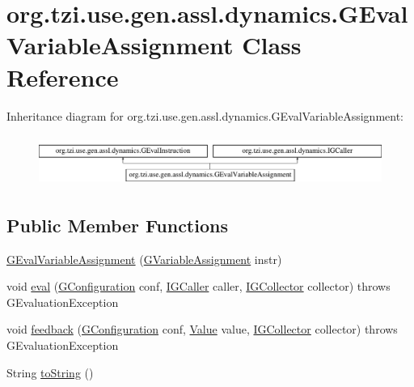 \hypertarget{classorg_1_1tzi_1_1use_1_1gen_1_1assl_1_1dynamics_1_1_g_eval_variable_assignment}{\section{org.\-tzi.\-use.\-gen.\-assl.\-dynamics.\-G\-Eval\-Variable\-Assignment Class Reference}
\label{classorg_1_1tzi_1_1use_1_1gen_1_1assl_1_1dynamics_1_1_g_eval_variable_assignment}
}
Inheritance diagram for org.\-tzi.\-use.\-gen.\-assl.\-dynamics.\-G\-Eval\-Variable\-Assignment\-:\begin{figure}[H]
\begin{center}
\leavevmode
\includegraphics[height=1.661721cm]{classorg_1_1tzi_1_1use_1_1gen_1_1assl_1_1dynamics_1_1_g_eval_variable_assignment}
\end{center}
\end{figure}
\subsection*{Public Member Functions}
\begin{DoxyCompactItemize}
\item 
\hyperlink{classorg_1_1tzi_1_1use_1_1gen_1_1assl_1_1dynamics_1_1_g_eval_variable_assignment_a52f7f8a359e4a9229517839110c53b2a}{G\-Eval\-Variable\-Assignment} (\hyperlink{classorg_1_1tzi_1_1use_1_1gen_1_1assl_1_1statics_1_1_g_variable_assignment}{G\-Variable\-Assignment} instr)
\item 
void \hyperlink{classorg_1_1tzi_1_1use_1_1gen_1_1assl_1_1dynamics_1_1_g_eval_variable_assignment_a989ef77954f72db44505a35152055874}{eval} (\hyperlink{classorg_1_1tzi_1_1use_1_1gen_1_1assl_1_1dynamics_1_1_g_configuration}{G\-Configuration} conf, \hyperlink{interfaceorg_1_1tzi_1_1use_1_1gen_1_1assl_1_1dynamics_1_1_i_g_caller}{I\-G\-Caller} caller, \hyperlink{interfaceorg_1_1tzi_1_1use_1_1gen_1_1assl_1_1dynamics_1_1_i_g_collector}{I\-G\-Collector} collector)  throws G\-Evaluation\-Exception 
\item 
void \hyperlink{classorg_1_1tzi_1_1use_1_1gen_1_1assl_1_1dynamics_1_1_g_eval_variable_assignment_a2194143add93469b3866453a9b7e3fe5}{feedback} (\hyperlink{classorg_1_1tzi_1_1use_1_1gen_1_1assl_1_1dynamics_1_1_g_configuration}{G\-Configuration} conf, \hyperlink{classorg_1_1tzi_1_1use_1_1uml_1_1ocl_1_1value_1_1_value}{Value} value, \hyperlink{interfaceorg_1_1tzi_1_1use_1_1gen_1_1assl_1_1dynamics_1_1_i_g_collector}{I\-G\-Collector} collector)  throws G\-Evaluation\-Exception 
\item 
String \hyperlink{classorg_1_1tzi_1_1use_1_1gen_1_1assl_1_1dynamics_1_1_g_eval_variable_assignment_a6f44cdd570ff9473de8b2dd1b04d1941}{to\-String} ()
\end{DoxyCompactItemize}
